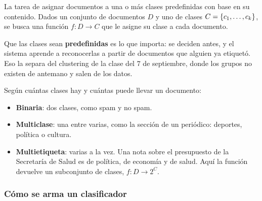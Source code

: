 \documentclass[11pt,letterpaper]{article}
\begin{document}
\begin{definicion}
    La tarea de asignar documentos a una o más clases predefinidas con
    base en su contenido. Dados un conjunto de documentos $D$ y uno de
    clases $C = \left\{ c_1, \dots, c_k \right\}$, se busca una función
    $f : D \to C$ que le asigne su clase a cada documento.
\end{definicion}

Que las clases sean \textbf{predefinidas} es lo que importa: se deciden
antes, y el sistema aprende a reconocerlas a partir de documentos que
alguien ya etiquetó. Eso la separa del clustering de la clase del $7$
de septiembre, donde los grupos no existen de antemano y salen de los
datos.

Según cuántas clases hay y cuántas puede llevar un documento:

\begin{itemize}[itemsep=0.3em]
    \item \textbf{Binaria}: dos clases, como spam y no spam.
    \item \textbf{Multiclase}: una entre varias, como la sección de un
          periódico: deportes, política o cultura.
    \item \textbf{Multietiqueta}: varias a la vez. Una nota sobre el
          presupuesto de la Secretaría de Salud es de política, de
          economía y de salud. Aquí la función devuelve un subconjunto
          de clases, $f : D \to 2^C$.
\end{itemize}

\subsubsection*{Cómo se arma un clasificador}

\begin{center}
\end{center}
\end{document}

